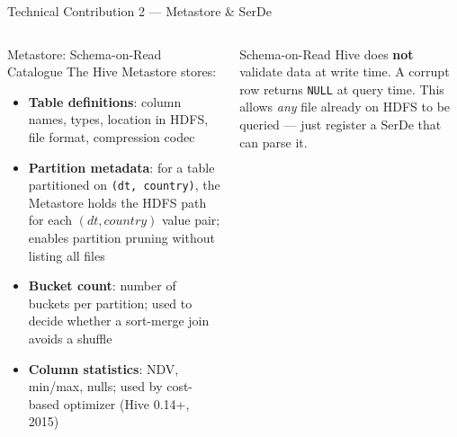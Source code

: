 \documentclass[aspectratio=169,10pt]{beamer}
\begin{document}
\begin{frame}{Technical Contribution 2 — Metastore \& SerDe}
  \begin{columns}[T]
      \begin{block}{Metastore: Schema-on-Read Catalogue}
        The Hive Metastore stores:
        \begin{itemize}
          \item \textbf{Table definitions}: column names, types,
                location in HDFS, file format, compression codec
          \item \textbf{Partition metadata}: for a table partitioned
                on \texttt{(dt, country)}, the Metastore holds the
                HDFS path for each $(dt, country)$ value pair;
                enables partition pruning without listing all files
          \item \textbf{Bucket count}: number of buckets per partition;
                used to decide whether a sort-merge join avoids a shuffle
          \item \textbf{Column statistics}: NDV, min/max, nulls;
                used by cost-based optimizer (Hive 0.14+, 2015)
        \end{itemize}
      \end{block}
      \vspace{4pt}
      \begin{alertblock}{Schema-on-Read}
        Hive does \textbf{not} validate data at write time.
        A corrupt row returns \texttt{NULL} at query time.
        This allows \emph{any} file already on HDFS to be
        queried — just register a SerDe that can parse it.
      \end{alertblock}


\end{columns}
\end{frame}
\end{document}
